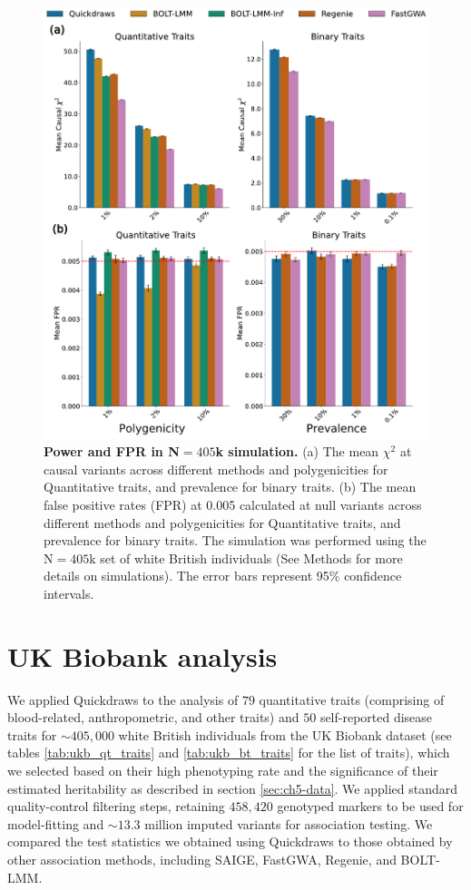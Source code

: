 \begin{figure}[h!]
    \centering
    \includegraphics[width=\textwidth]{figures/qd_panel_sim.pdf}
    \caption{\textbf{Power and FPR in N$=405$k simulation.}
    (a) The mean $\chi^2$ at causal variants across different methods and polygenicities for Quantitative traits, and prevalence for binary traits. 
    (b) The mean false positive rates (FPR) at 0.005 calculated at null variants across different methods and polygenicities for Quantitative traits, and prevalence for binary traits.
    The simulation was performed using the N$=405$k set of white British individuals (See Methods for more details on simulations). The error bars represent 95\% confidence intervals.
    }
    \label{fig:sim_400k}
\end{figure}

\clearpage

\section{UK Biobank analysis}
\label{sec:ch5-ukb}

We applied Quickdraws to the analysis of $79$ quantitative traits (comprising of blood-related, anthropometric, and other traits) and $50$ self-reported disease traits for ${\sim}405{,}000$ white British individuals from the UK Biobank dataset (see tables \ref{tab:ukb_qt_traits} and \ref{tab:ukb_bt_traits} for the list of traits), which we selected based on their high phenotyping rate and the significance of their estimated heritability as described in section \ref{sec:ch5-data}.
%
We applied standard quality-control filtering steps, retaining $458{,}420$ genotyped markers to be used for model-fitting and ${\sim}13.3$ million imputed variants for association testing.
%
We compared the test statistics we obtained using Quickdraws to those obtained by other association methods, including SAIGE, FastGWA, Regenie, and BOLT-LMM.
%

